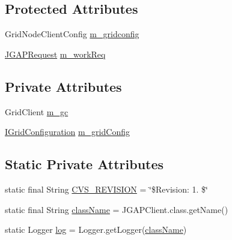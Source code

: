 \subsection*{Protected Attributes}
\begin{DoxyCompactItemize}
\item 
Grid\-Node\-Client\-Config \hyperlink{classorg_1_1jgap_1_1distr_1_1grid_1_1_j_g_a_p_client_acdd8efaedc2f7a6dd064fa5373ad1dd4}{m\-\_\-gridconfig}
\item 
\hyperlink{classorg_1_1jgap_1_1distr_1_1grid_1_1_j_g_a_p_request}{J\-G\-A\-P\-Request} \hyperlink{classorg_1_1jgap_1_1distr_1_1grid_1_1_j_g_a_p_client_a8961dde85d542276dc4839a199ef4efe}{m\-\_\-work\-Req}
\end{DoxyCompactItemize}
\subsection*{Private Attributes}
\begin{DoxyCompactItemize}
\item 
Grid\-Client \hyperlink{classorg_1_1jgap_1_1distr_1_1grid_1_1_j_g_a_p_client_a3941da8ea8f19d5b81115c2d559ff06f}{m\-\_\-gc}
\item 
\hyperlink{interfaceorg_1_1jgap_1_1distr_1_1grid_1_1_i_grid_configuration}{I\-Grid\-Configuration} \hyperlink{classorg_1_1jgap_1_1distr_1_1grid_1_1_j_g_a_p_client_afc5c5a6b65207304d89e04e319ee8a1a}{m\-\_\-grid\-Config}
\end{DoxyCompactItemize}
\subsection*{Static Private Attributes}
\begin{DoxyCompactItemize}
\item 
static final String \hyperlink{classorg_1_1jgap_1_1distr_1_1grid_1_1_j_g_a_p_client_a9b838e5f32f6957978961401a7f40d65}{C\-V\-S\-\_\-\-R\-E\-V\-I\-S\-I\-O\-N} = \char`\"{}\$Revision\-: 1. \$\char`\"{}
\item 
static final String \hyperlink{classorg_1_1jgap_1_1distr_1_1grid_1_1_j_g_a_p_client_afa8f2491f7f6609001e99ed2d0bb9c13}{class\-Name} = J\-G\-A\-P\-Client.\-class.\-get\-Name()
\item 
static Logger \hyperlink{classorg_1_1jgap_1_1distr_1_1grid_1_1_j_g_a_p_client_a66c6b3f83748216504b5f9e2cb8fd9d2}{log} = Logger.\-get\-Logger(\hyperlink{classorg_1_1jgap_1_1distr_1_1grid_1_1_j_g_a_p_client_afa8f2491f7f6609001e99ed2d0bb9c13}{class\-Name})
\end{DoxyCompactItemize}


